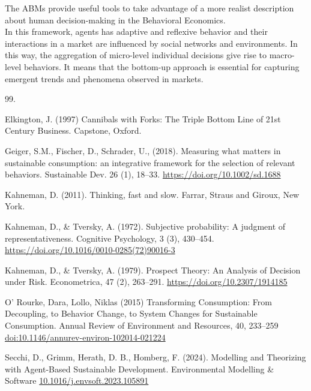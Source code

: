 \documentclass[11pt]{article} %
\begin{document}
The ABMs provide useful tools to take advantage of a more realist description about 
human decision-making in the Behavioral Economics. \\

In this framework, agents has adaptive and reflexive behavior and their interactions in a market 
are influenced by social networks and environments. In this way, the aggregation of micro-level individual
decisions give rise to macro-level behaviors. It means that the bottom-up approach is essential for
capturing emergent trends and phenomena observed in markets.

\newpage


\begin{thebibliography}{99.}%
%

Elkington, J. (1997) Cannibals with Forks: The Triple Bottom Line of 21st Century 
Business. Capstone, Oxford. 

Geiger, S.M., Fischer, D., Schrader, U., (2018). Measuring what matters in sustainable 
consumption: an integrative framework for the selection of relevant behaviors. 
Sustainable Dev. 26 (1), 18--33.
\url{https://doi.org/10.1002/sd.1688}

Kahneman, D. (2011). Thinking, fast and slow. Farrar, Straus and Giroux, New York.

Kahneman, D., \& Tversky, A. (1972). Subjective probability: A judgment of representativeness.
Cognitive Psychology, 3 (3), 430--454. 
\url{https://doi.org/10.1016/0010-0285(72)90016-3}

Kahneman, D., \& Tversky, A. (1979). Prospect Theory: An Analysis of Decision under Risk. Econometrica, 
47 (2), 263--291. 
\url{https://doi.org/10.2307/1914185}

O' Rourke, Dara, Lollo, Niklas (2015) Transforming Consumption: From Decoupling, to Behavior Change, to System Changes for Sustainable Consumption. 
Annual Review of Environment and Resources, 40, 233--259 
\url{doi:10.1146/annurev-environ-102014-021224}


Secchi, D., Grimm, Herath, D. B., Homberg, F. (2024). Modelling and Theorizing with 
Agent-Based Sustainable Development. Environmental Modelling \& Software 
\url{10.1016/j.envsoft.2023.105891}


\end{thebibliography}
\end{document}
